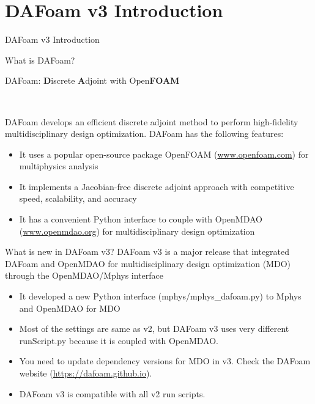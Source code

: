 \documentclass{bredelebeamer}
\begin{document}
\section{DAFoam v3 Introduction}
\renewcommand{\arraystretch}{2}

\begin{frame}{}
  \center \Large DAFoam v3 Introduction
\end{frame}

\begin{frame}{What is DAFoam?}

  {\large DAFoam: \textbf{D}iscrete \textbf{A}djoint with Open\textbf{FOAM}}

  ~

  DAFoam develops an efficient discrete adjoint method to perform high-fidelity multidisciplinary design optimization. DAFoam has the following features:
  \center \normalsize
  \begin{itemize}
    \setlength\itemsep{1em}
    \item It uses a popular open-source package OpenFOAM (\url{www.openfoam.com}) for multiphysics analysis
    \item It implements a Jacobian-free discrete adjoint approach with competitive speed, scalability, and accuracy
    \item It has a convenient Python interface to couple with OpenMDAO (\url{www.openmdao.org}) for multidisciplinary design optimization
  \end{itemize}

\end{frame}

\begin{frame}{What is new in DAFoam v3?}
  DAFoam v3 is a major release that integrated DAFoam and OpenMDAO for multidisciplinary design optimization (MDO) through the OpenMDAO/Mphys interface

  \begin{itemize}
    \setlength\itemsep{1em}
    \item It developed a new Python interface (mphys/mphys\_dafoam.py) to Mphys and OpenMDAO for MDO
    \item Most of the settings are same as v2, but DAFoam v3 uses very different runScript.py because it is coupled with OpenMDAO.
    \item You need to update dependency versions for MDO in v3. Check the DAFoam website (\url{https://dafoam.github.io}).
    \item DAFoam v3 is compatible with all v2 run scripts.
  \end{itemize}
  
\end{frame}
\end{document}
